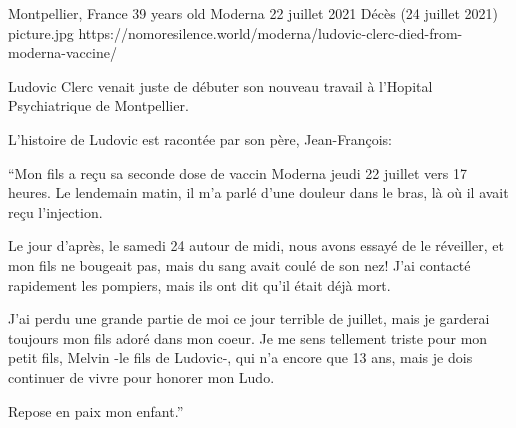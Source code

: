 {Montpellier, France}
{39 years old}
{Moderna}
{22 juillet 2021}
{Décès (24 juillet 2021)}
{picture.jpg}
{https://nomoresilence.world/moderna/ludovic-clerc-died-from-moderna-vaccine/}
{

Ludovic Clerc venait juste de débuter son nouveau travail à l'Hopital
Psychiatrique de Montpellier.

L'histoire de Ludovic est racontée par son père, Jean-François:

“Mon fils a reçu sa seconde dose de vaccin Moderna jeudi 22 juillet vers 17
heures. Le lendemain matin, il m'a parlé d'une douleur dans le bras, là où il
avait reçu l'injection.

Le jour d'après, le samedi 24 autour de midi, nous avons essayé de le réveiller,
et mon fils ne bougeait pas, mais du sang avait coulé de son nez! J'ai contacté
rapidement les pompiers, mais ils ont dit qu'il était déjà mort.

J'ai perdu une grande partie de moi ce jour terrible de juillet, mais je
garderai toujours mon fils adoré dans mon coeur. Je me sens tellement triste
pour mon petit fils, Melvin -le fils de Ludovic-, qui n'a encore que 13 ans,
mais je dois continuer de vivre pour honorer mon Ludo.

Repose en paix mon enfant.”

}
